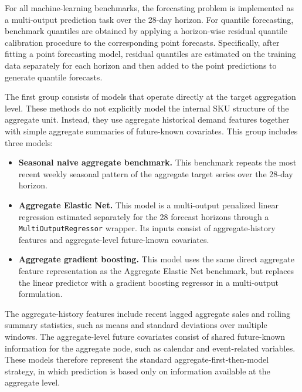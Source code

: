 \documentclass[12pt]{article}
\begin{document}
For all machine-learning benchmarks, the forecasting problem is implemented as a multi-output prediction task over the 28-day horizon. For quantile forecasting, benchmark quantiles are obtained by applying a horizon-wise residual quantile calibration procedure to the corresponding point forecasts. Specifically, after fitting a point forecasting model, residual quantiles are estimated on the training data separately for each horizon and then added to the point predictions to generate quantile forecasts.

The first group consists of models that operate directly at the target aggregation level. These methods do not explicitly model the internal SKU structure of the aggregate unit. Instead, they use aggregate historical demand features together with simple aggregate summaries of future-known covariates. This group includes three models:

\begin{itemize}
  \item \textbf{Seasonal naive aggregate benchmark.}
        This benchmark repeats the most recent weekly seasonal pattern of the aggregate target series over the 28-day horizon.

  \item \textbf{Aggregate Elastic Net.}
        This model is a multi-output penalized linear regression \parencite{zou2005elasticnet} estimated separately for the 28 forecast horizons through a \texttt{MultiOutputRegressor} wrapper. Its inputs consist of aggregate-history features and aggregate-level future-known covariates.

  \item \textbf{Aggregate gradient boosting.}
        This model uses the same direct aggregate feature representation as the Aggregate Elastic Net benchmark, but replaces the linear predictor with a gradient boosting regressor \parencite{friedman2001greedy,ke2017lightgbm} in a multi-output formulation.
\end{itemize}

The aggregate-history features include recent lagged aggregate sales and rolling summary statistics, such as means and standard deviations over multiple windows. The aggregate-level future covariates consist of shared future-known information for the aggregate node, such as calendar and event-related variables. These models therefore represent the standard aggregate-first-then-model strategy, in which prediction is based only on information available at the aggregate level.
\end{document}
